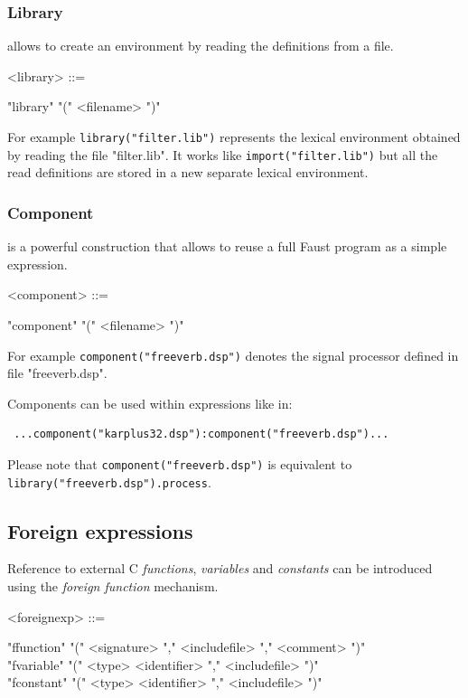 \documentclass[a4paper]{book}
\begin{document}
\subsubsection{Library} allows to create an environment by reading the definitions from a file.

\begin{grammar}
  <library> ::= 
  \begin{syntdiag}
      "library" "(" <filename> ")"
  \end{syntdiag}
\end{grammar}

For example \lstinline'library("filter.lib")' represents the lexical environment 
obtained by reading the file "filter.lib". It works like \lstinline'import("filter.lib")' but all the read definitions are stored in a new separate lexical environment.


\subsubsection{Component} is a powerful construction that allows to reuse a full Faust program as a simple expression.

\begin{grammar}
  <component> ::= 
  \begin{syntdiag}
    "component" "(" <filename> ")"
  \end{syntdiag}
\end{grammar}

 For example \lstinline'component("freeverb.dsp")' denotes the signal processor defined in file "freeverb.dsp". 
 
 Components can be used within expressions like in: 
 \begin{lstlisting}
 ...component("karplus32.dsp"):component("freeverb.dsp")... 
 \end{lstlisting}
 
 Please note that \lstinline'component("freeverb.dsp")' is equivalent to \lstinline'library("freeverb.dsp").process'.


\subsection{Foreign expressions}

Reference to external C \textit{functions}, \textit{variables} and \textit{constants} can be introduced using the \textit{foreign function} mechanism.

\begin{grammar}
  <foreignexp> ::= 
  \begin{syntdiag}
    \begin{stack}
      "ffunction" "(" <signature> "," <includefile> "," <comment> ")" \\
      "fvariable" "(" <type> <identifier> "," <includefile> ")" \\
      "fconstant" "(" <type> <identifier> "," <includefile> ")" 
    \end{stack}
  \end{syntdiag}
\end{grammar}
\end{document}
